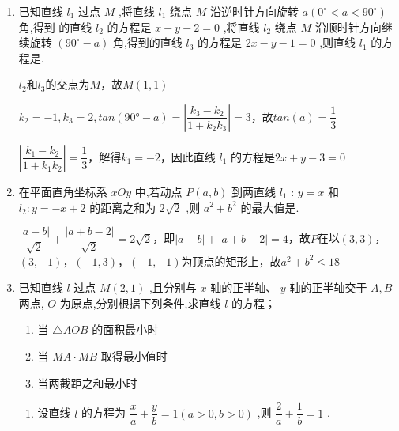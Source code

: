\begin{enumerate}
\begin{jieda}
        由 $\dfrac{1}{a} = \dfrac{a}{4}$ 解得 $a = 2$ 或 $a =  - 2$
        
        所以 “ $a =  - 2$ ” 是 “直线 $x + {ay} + 3 = 0$ 与 ${ax} + {4y} + 6 = 0$ 平行” 的充要条件.
    \end{jieda}
    \item 已知直线 ${l}_{1}$ 过点 $M$ ,将直线 ${l}_{1}$ 绕点 $M$ 沿逆时针方向旋转 $a\left( {{0}^{ \circ  } < a < {90}^{ \circ  }}\right)$ 角,得到 的直线 ${l}_{2}$ 的方程是 $x + y - 2 = 0$ ,将直线 ${l}_{2}$ 绕点 $M$ 沿顺时针方向继续旋转 $\left( {{90}^{ \circ  } - a}\right)$ 角,得到的直线 ${l}_{3}$ 的方程是 ${2x} - y - 1 = 0$ ,则直线 ${l}_{1}$ 的方程是.
    \begin{jieda}
        $l_2$和$l_3$的交点为$M$，故$M(1, 1)$

        $k_2 = -1, k_3 = 2, tan(\ang{90} - a) = \left|\dfrac{k_3-k_2}{1+k_2k_3}\right| = 3$，故$tan(a) = \dfrac{1}{3}$
        
        $\left|\dfrac{k_1-k_2}{1+k_1k_2}\right| = \dfrac{1}{3}$，解得$k_1 = -2$，因此直线 ${l}_{1}$ 的方程是$2x+y-3 = 0$
    \end{jieda}
    \item 在平面直角坐标系 ${xOy}$ 中,若动点 $P\left( {a,b}\right)$ 到两直线 ${l}_{1}$ : $y = x$ 和 ${l}_{2} : y =  - x + 2$ 的距离之和为 $2\sqrt{2}$ ,则 ${a}^{2} + {b}^{2}$ 的最大值是.
    \begin{jieda}
        $\dfrac{|a-b|}{\sqrt{2}} + \dfrac{|a+b-2|}{\sqrt{2}} = 2\sqrt{2}$，即$|a-b| + |a+b-2| = 4$，故$P$在以$(3, 3)$，$(3, -1)$，$(-1, 3)$，$(-1, -1)$为顶点的矩形上，故$a^2+b^2 \leq 18$
    \end{jieda}
    \item 已知直线 $l$ 过点 $M\left( {2,1}\right)$ ,且分别与 $x$ 轴的正半轴、 $y$ 轴的正半轴交于 $A,B$ 两点, $O$ 为原点,分别根据下列条件,求直线 $l$ 的方程；
    \begin{enumerate}
        \item 当 $\bigtriangleup {AOB}$ 的面积最小时
        \item 当 ${MA} \cdot  {MB}$ 取得最小值时
        \item 当两截距之和最小时
    \end{enumerate}
    \begin{jieda}
        \begin{enumerate}
            \item 设直线 $l$ 的方程为 $\dfrac{x}{a} + \dfrac{y}{b} = 1\left( {a > 0,b > 0}\right)$ ,则 $\dfrac{2}{a} + \dfrac{1}{b} = 1$ .
            

\end{enumerate}
\end{jieda}
\end{enumerate}
